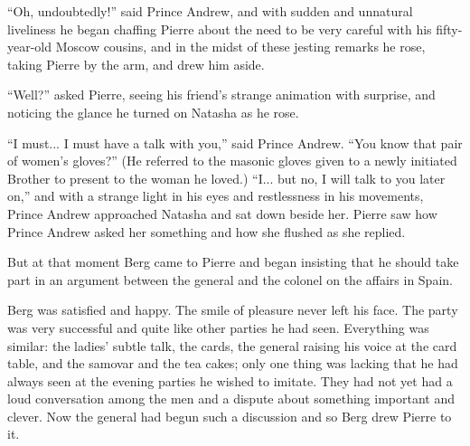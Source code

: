 ``Oh, undoubtedly!'' said Prince Andrew, and with sudden and
unnatural liveliness he began chaffing Pierre about the need to
be very careful with his fifty-year-old Moscow cousins, and in
the midst of these jesting remarks he rose, taking Pierre by the
arm, and drew him aside.

``Well?'' asked Pierre, seeing his friend's strange animation
with surprise, and noticing the glance he turned on Natasha as he
rose.

``I must... I must have a talk with you,'' said Prince
Andrew. ``You know that pair of women's gloves?'' (He referred to
the masonic gloves given to a newly initiated Brother to present
to the woman he loved.) ``I...  but no, I will talk to you later
on,'' and with a strange light in his eyes and restlessness in
his movements, Prince Andrew approached Natasha and sat down
beside her. Pierre saw how Prince Andrew asked her something and
how she flushed as she replied.

But at that moment Berg came to Pierre and began insisting that
he should take part in an argument between the general and the
colonel on the affairs in Spain.

Berg was satisfied and happy. The smile of pleasure never left
his face.  The party was very successful and quite like other
parties he had seen.  Everything was similar: the ladies' subtle
talk, the cards, the general raising his voice at the card table,
and the samovar and the tea cakes; only one thing was lacking
that he had always seen at the evening parties he wished to
imitate. They had not yet had a loud conversation among the men
and a dispute about something important and clever. Now the
general had begun such a discussion and so Berg drew Pierre to
it.


